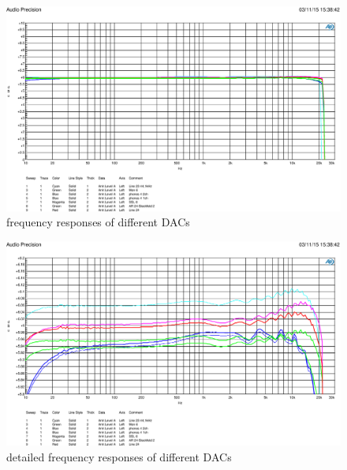 \documentclass[11pt]{report}
\begin{document}
\begin{figure}[htbp]
\begin{center}
\includegraphics[width=14cm,keepaspectratio=true]{DAWandlerVergleich10dB}
\caption{frequency responses of different DACs}
\label{Abb.:1}
\end{center}
\end{figure}

\begin{figure}[htbp]
\begin{center}
\includegraphics[width=14cm,keepaspectratio=true]{DaWandlerVergleich}
\caption{detailed frequency responses of different DACs}
\label{Abb.:1}
\end{center}
\end{figure}
\end{document}
